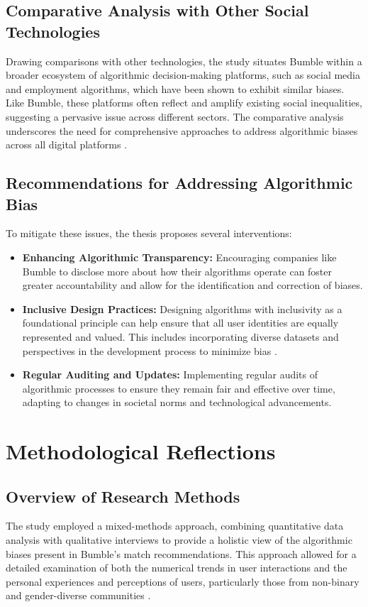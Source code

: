 \subsection{Comparative Analysis with Other Social Technologies}
Drawing comparisons with other technologies, the study situates Bumble within a broader ecosystem of algorithmic decision-making platforms, such as social media and employment algorithms, which have been shown to exhibit similar biases. Like Bumble, these platforms often reflect and amplify existing social inequalities, suggesting a pervasive issue across different sectors. The comparative analysis underscores the need for comprehensive approaches to address algorithmic biases across all digital platforms \cite{ONeil_2016}.

\subsection{Recommendations for Addressing Algorithmic Bias}
To mitigate these issues, the thesis proposes several interventions:
\begin{itemize}
    \item \textbf{Enhancing Algorithmic Transparency:} Encouraging companies like Bumble to disclose more about how their algorithms operate can foster greater accountability and allow for the identification and correction of biases.
    \item \textbf{Inclusive Design Practices:} Designing algorithms with inclusivity as a foundational principle can help ensure that all user identities are equally represented and valued. This includes incorporating diverse datasets and perspectives in the development process to minimize bias \cite{Costanza-Chock_2020}.
    \item \textbf{Regular Auditing and Updates:} Implementing regular audits of algorithmic processes to ensure they remain fair and effective over time, adapting to changes in societal norms and technological advancements.
\end{itemize}

\section{Methodological Reflections}
\subsection{Overview of Research Methods}
The study employed a mixed-methods approach, combining quantitative data analysis with qualitative interviews to provide a holistic view of the algorithmic biases present in Bumble's match recommendations. This approach allowed for a detailed examination of both the numerical trends in user interactions and the personal experiences and perceptions of users, particularly those from non-binary and gender-diverse communities \cite{Kalra_Gupta_Varghese_Rangaswamy_2023}.

